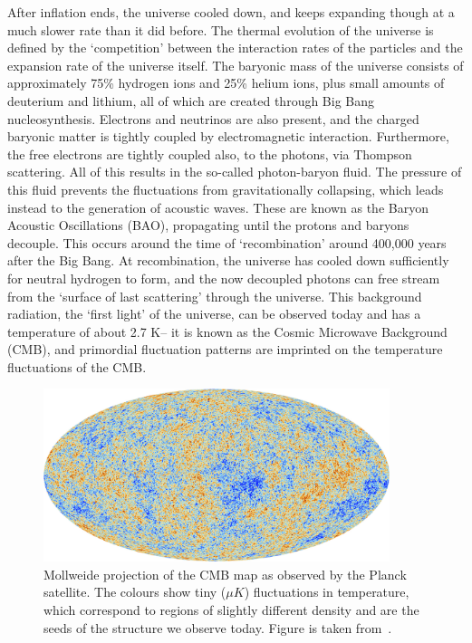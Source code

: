 After inflation ends, the universe cooled down, and keeps expanding though at a much slower rate than it did before. The thermal evolution of the universe is defined by the `competition' between the interaction rates of the particles and the expansion rate of the universe itself. The baryonic mass of the universe consists of approximately 75\% hydrogen ions and 25\% helium ions, plus small amounts of deuterium and lithium, all of which are created through Big Bang nucleosynthesis. Electrons and neutrinos are also present, and the charged baryonic matter is tightly coupled by electromagnetic interaction. Furthermore, the free electrons are tightly coupled also, to the photons, via Thompson scattering. All of this results in the so-called photon-baryon fluid. The pressure of this fluid prevents the fluctuations from gravitationally collapsing, which leads instead to the generation of acoustic waves. These are known as the Baryon Acoustic Oscillations (BAO), propagating until the protons and baryons decouple. This occurs around the time of `recombination' around 400,000 years after the Big Bang. At recombination, the universe has cooled down sufficiently for neutral hydrogen to form, and the now decoupled photons can free stream from the `surface of last scattering' through the universe. This background radiation, the `first light' of the universe, can be observed today and has a temperature of about 2.7 K-- it is known as the Cosmic Microwave Background (CMB), and primordial fluctuation patterns are imprinted on the temperature fluctuations of the CMB. 
\begin{figure}[!ht]
	\centering
	\includegraphics[width=0.9\textwidth]{fig/Planck_CMB.jpg}
	\caption{Mollweide projection of the CMB map as observed by the Planck satellite. The colours show tiny ($\mu K$) fluctuations in temperature, which correspond to regions of slightly different density and are the seeds of the structure we observe today. Figure is taken from~\cite{ESA:2013cmb}.}
\end{figure}

